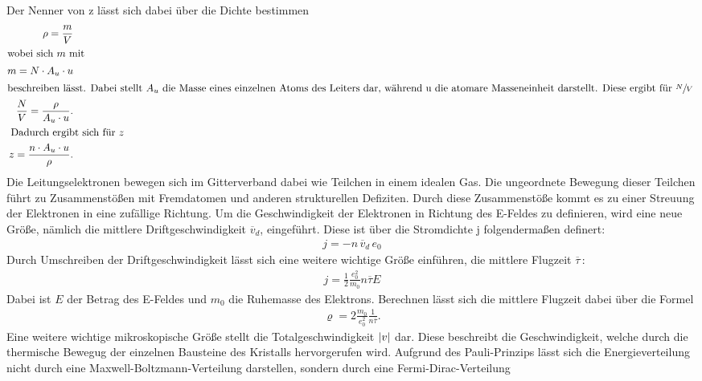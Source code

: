 Der Nenner von z lässt sich dabei über die Dichte bestimmen
\begin{subequations}
\begin{align}
    \rho = \frac{m}{V} \label{eq:4a} \\
    \intertext{wobei sich $m$ mit
    }
    m =N \cdot A_u \cdot u \label{eq:4b} \\
    \intertext{beschreiben lässt. Dabei stellt $A_u$ die Masse eines einzelnen
    Atoms des Leiters dar, während u die atomare Masseneinheit darstellt.
    Diese ergibt für $\sfrac{N}{V}$
    }
    \frac{N}{V}= \frac{\rho}{A_u \cdot u}.\label{eq:4c} \\
    \intertext{ Dadurch ergibt sich für $z$
    }
    z=\frac{n \cdot A_u \cdot u}{\rho}. \label{eq:4d}
\end{align}
\end{subequations}
Die Leitungselektronen bewegen sich im Gitterverband dabei wie Teilchen in einem idealen Gas.
Die ungeordnete Bewegung dieser Teilchen führt zu Zusammenstößen mit Fremdatomen und anderen
strukturellen Defiziten. Durch diese Zusammenstöße kommt es zu einer Streuung der
Elektronen in eine zufällige Richtung. Um die Geschwindigkeit der Elektronen in 
Richtung des E-Feldes zu definieren, wird eine neue Größe, nämlich die mittlere Driftgeschwindigkeit
$\overline{v} _d$, eingeführt. Diese ist über die Stromdichte j folgendermaßen definert: \cite{V311}
\begin{align}
    j = -n \, \overline{v} _d\, e_0 \label{eq:5}
\end{align}
Durch Umschreiben der Driftgeschwindigkeit lässt sich eine weitere wichtige Größe einführen,
die mittlere Flugzeit $\overline{\tau}\,$: \cite{V311}
\begin{align}
    j = \frac{1}{2}\frac{e_0^2}{m_0} n \overline{\tau} E \label{eq:6}
\end{align}
Dabei ist $E$ der Betrag des E-Feldes und $m_0$ die Ruhemasse des Elektrons.
Berechnen lässt sich die mittlere Flugzeit dabei über die Formel \cite{V311}
\begin{align}
\varrho = 2 \frac{m_0}{e_0^2}\frac{1}{n \overline{\tau}}. \label{eq:7}
\end{align}
Eine weitere wichtige mikroskopische Größe stellt die Totalgeschwindigkeit $\lvert v\rvert$ dar.
Diese beschreibt die Geschwindigkeit, welche durch die thermische Bewegug der einzelnen
Bausteine des Kristalls hervorgerufen wird. Aufgrund des Pauli-Prinzips lässt sich
die Energieverteilung nicht durch eine Maxwell-Boltzmann-Verteilung darstellen, 
sondern durch eine Fermi-Dirac-Verteilung \cite{V311}
